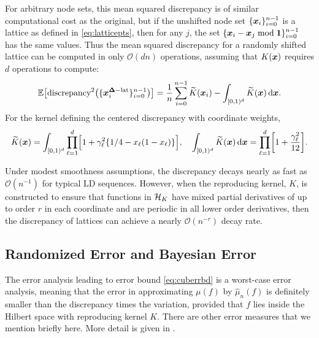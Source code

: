 \documentclass{svproc}
\begin{document}
For arbitrary node sets, this mean squared discrepancy is of similar computational cost as the original, but if the unshifted node set $\{{\boldsymbol{x}}_i\}_{i=0}^{n-1}$ is a lattice as defined in \eqref{eq:latticepts}, then for any $j$, the set $\{{\boldsymbol{x}}_i - {\boldsymbol{x}}_j \bmod {\boldsymbol{1}} \}_{i=0}^{n-1}$ has the same values.  Thus the mean squared discrepancy for a randomly shifted lattice can be computed in only $\mathcal{O}(dn)$ operations, assuming that $K({\boldsymbol{x}})$ requires $d$ operations to compute:
\begin{equation}
\mathbb{E}\bigl[\text{discrepancy}^2 \bigl (\{ {\boldsymbol{x}}^{{\boldsymbol{\Delta}}-\text{lat}}_{i} \}_{i=0}^{n-1} \bigr) \bigr] = \frac{1}{n} \sum_{i=0}^{n-1}  \widetilde{K}({\boldsymbol{x}}_i) - \int_{[0,1)^d} \widetilde{K}({\boldsymbol{x}}) \, \mathrm{d} {\boldsymbol{x}}.
\end{equation}
For the kernel defining the centered discrepancy with coordinate weights,
\begin{equation}
    \widetilde{K}({\boldsymbol{x}}) = \int_{[0,1)^d} \prod_{\ell = 1}^d \Bigl [ 1 + \gamma_\ell^2 \{ 1/4 - x_\ell (1-x_\ell ) \} \Bigr], \quad \int_{[0,1)^d} \widetilde{K}({\boldsymbol{x}}) \, \mathrm{d} {\boldsymbol{x}} = \prod_{\ell = 1}^d \biggl [ 1 + \frac{\gamma_\ell^2}{12} \biggr ].
\end{equation}

Under modest smoothness assumptions, the discrepancy decays nearly as fast as $\mathcal{O}(n^{-1})$ for typical LD sequences.  However, when the reproducing kernel, $K$, is constructed to ensure that functions in ${\mathcal{H}}_K$ have mixed partial derivatives of up to order $r$ in each coordinate and are periodic in all lower order derivatives, then the discrepancy of lattices can achieve a nearly $\mathcal{O}(n^{-r})$ decay rate.



\subsection{Randomized Error and Bayesian Error}
The error analysis leading to error bound \eqref{eq:cuberrbd} is a worst-case error analysis, meaning that the error in approximating $\mu(f)$ by $\hat{\mu}_n(f)$ is definitely smaller than the discrepancy times the variation, provided that $f$ lies inside the Hilbert space with reproducing kernel $K$.  There are other error measures that we mention briefly here.  More detail is given in \cite{HicEtal17a}.
\end{document}
